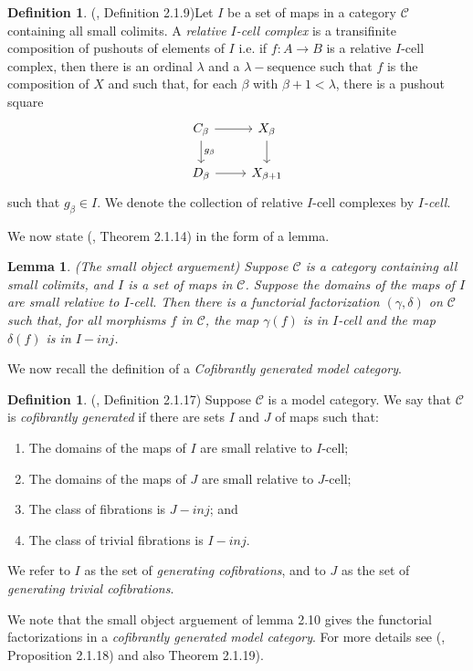 \documentclass{article}
\newcommand{\cC}{\mathcal{C}}
\newtheorem{lemma}[theorem]{Lemma}
\theoremstyle{definition}
\newtheorem{definition}[theorem]{Definition}
\theoremstyle{remark}
\begin{document}
\begin{definition}
    (\cite{MR1650134}, Definition 2.1.9)\label{def:I-cell} Let $I$ be a set of maps in a category $\cC$ containing all small colimits. A \textit{relative $I$-cell complex} is a transifinite composition of pushouts of elements of $I$ i.e. if $f: A \rightarrow B$ is a relative $I$-cell complex, then there is an ordinal $\lambda$ and a $\lambda-$sequence such that $f$ is the composition of $X$ and such that, for each $\beta$ with $\beta+1 < \lambda$, there is a pushout square
     \[\begin{tikzcd}
        C_{\beta} \arrow{r} \arrow{d}{g_{\beta}}  & X_{\beta} \arrow{d} \\
        D_{\beta} \arrow{r} & X_{\beta+1}
     \end{tikzcd}
     \]  
     such that $g_{\beta} \in I$. We denote the collection of relative $I$-cell complexes by \textit{$I$-cell}.
\end{definition}
We now state (\cite{MR1650134}, Theorem 2.1.14) in the form of a lemma.
\begin{lemma}
    (The small object arguement) Suppose $\cC$ is a category containing all small colimits, and $I$ is a set of maps in $\cC$. Suppose the domains of the maps of $I$ are small relative to $I$-cell. Then there is a functorial factorization $(\gamma,\delta)$ on $\cC$ such that, for all morphisms $f$ in $\cC$, the map $\gamma (f)$ is in $I$-cell and the map $\delta(f)$ is in $I-inj$. 
\end{lemma}
We now recall the definition of a \textit{Cofibrantly generated model category}. 
\begin{definition} \label{def:cofgenemodcat}
    (\cite{MR1650134}, Definition 2.1.17) Suppose $\cC$ is a model category. We say that $\cC$ is \textit{cofibrantly generated} if there are sets $I$ and $J$ of maps such that:
    \begin{enumerate}
        \item The domains of the maps of $I$ are small relative to $I$-cell;
        \item The domains of the maps of $J$ are small relative to $J$-cell;
        \item The class of fibrations is $J-inj$; and 
        \item The class of trivial fibrations is $I-inj$.
    \end{enumerate}
    We refer to $I$ as the set of \textit{generating cofibrations}, and to $J$ as the set of \textit{generating trivial cofibrations}.
\end{definition}
We note that the small object arguement of lemma 2.10 gives the functorial factorizations in a \textit{cofibrantly generated model category}. For more details see (\cite{MR1650134}, Proposition 2.1.18) and also Theorem 2.1.19).
\end{document}
